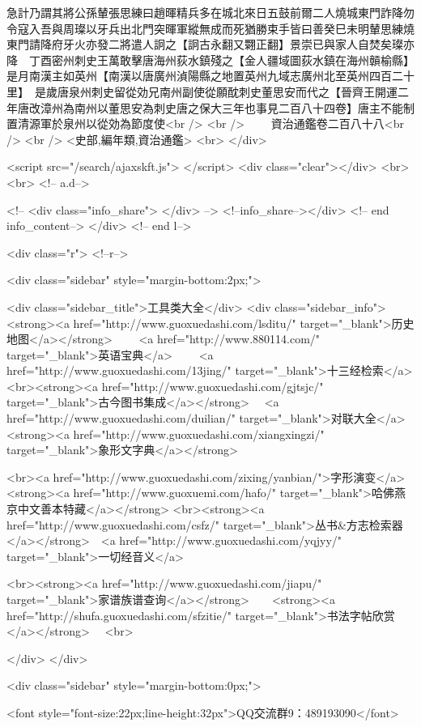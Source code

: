 急計乃謂其將公孫輦張思練曰趙暉精兵多在城北來日五鼓前爾二人燒城東門詐降勿令寇入吾與周璨以牙兵出北門突暉軍縱無成而死猶勝束手皆曰善癸巳未明輦思練燒東門請降府牙火亦發二將遣人詗之【詗古永翻又翾正翻】景崇已與家人自焚矣璨亦降　丁酉密州刺史王萬敢擊唐海州荻水鎮殘之【金人疆域圖荻水鎮在海州贑榆縣】　是月南漢主如英州【南漢以唐廣州湞陽縣之地置英州九域志廣州北至英州四百二十里】　是歲唐泉州刺史留從効兄南州副使從願酖刺史董思安而代之【晉齊王開運二年唐改漳州為南州以董思安為刺史唐之保大三年也事見二百八十四卷】唐主不能制置清源軍於泉州以從効為節度使<br />
<br />
　　資治通鑑卷二百八十八<br />
<br />
<史部,編年類,資治通鑑>  <br>
   </div> 

<script src="/search/ajaxskft.js"> </script>
 <div class="clear"></div>
<br>
<br>
 <!-- a.d-->

 <!--
<div class="info_share">
</div> 
-->
 <!--info_share--></div>   <!-- end info_content-->
  </div> <!-- end l-->

<div class="r">   <!--r-->



<div class="sidebar"  style="margin-bottom:2px;">

 
<div class="sidebar_title">工具类大全</div>
<div class="sidebar_info">
<strong><a href="http://www.guoxuedashi.com/lsditu/" target="_blank">历史地图</a></strong>　　
<a href="http://www.880114.com/" target="_blank">英语宝典</a>　　
<a href="http://www.guoxuedashi.com/13jing/" target="_blank">十三经检索</a>　
<br><strong><a href="http://www.guoxuedashi.com/gjtsjc/" target="_blank">古今图书集成</a></strong>　
<a href="http://www.guoxuedashi.com/duilian/" target="_blank">对联大全</a>　<strong><a href="http://www.guoxuedashi.com/xiangxingzi/" target="_blank">象形文字典</a></strong>　

<br><a href="http://www.guoxuedashi.com/zixing/yanbian/">字形演变</a>　　<strong><a href="http://www.guoxuemi.com/hafo/" target="_blank">哈佛燕京中文善本特藏</a></strong>
<br><strong><a href="http://www.guoxuedashi.com/csfz/" target="_blank">丛书&方志检索器</a></strong>　<a href="http://www.guoxuedashi.com/yqjyy/" target="_blank">一切经音义</a>　　

<br><strong><a href="http://www.guoxuedashi.com/jiapu/" target="_blank">家谱族谱查询</a></strong>　　<strong><a href="http://shufa.guoxuedashi.com/sfzitie/" target="_blank">书法字帖欣赏</a></strong>　
<br>

</div>
</div>


<div class="sidebar" style="margin-bottom:0px;">

<font style="font-size:22px;line-height:32px">QQ交流群9：489193090</font>


